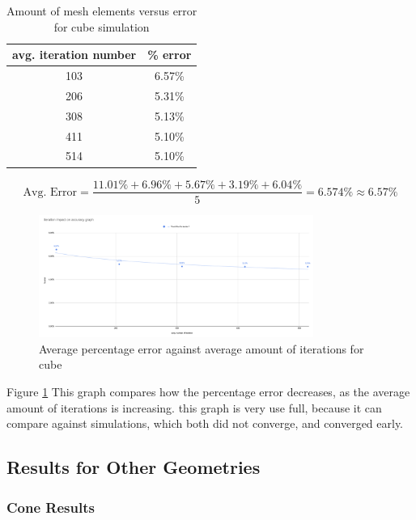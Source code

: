 \documentclass[12pt,a4paper]{article}
\begin{document}
\begin{table}[H]
\centering
\caption{Amount of mesh elements versus error for cube simulation}
\label{tab:cube_elements_error}
\begin{tabular}{|c|c|}
\hline
\rowcolor{lightblue}
\textbf{avg. iteration number}& \textbf{\% error} \\
\hline
103& 6.57\%\\
\hline
206& 5.31\%\\
\hline
308& 5.13\%\\
\hline
411& 5.10\%\\
\hline
514& 5.10\%\\
\hline
\end{tabular}
\end{table}
\[
\text{Avg. Error} = \frac{11.01\% + 6.96\% + 5.67\% + 3.19\% + 6.04\%}{5}= 6.574\% \approx 6.57\%
\]
\begin{figure}[H]
    \centering
    \includegraphics[width=0.8\textwidth]{Bildschirmfoto 2025-08-24 um 14.13.37.png}
    \caption{Average percentage error against average amount of iterations for cube}
    \label{fig:cube_iterations_error}
\end{figure}

Figure \ref{fig:cube_iterations_error} This graph compares how the percentage error decreases, as the average amount of iterations is increasing. this graph is very use full, because it can compare against simulations, which both did not converge, and converged early.

\subsection{Results for Other Geometries}

\subsubsection{Cone Results}
\end{document}
